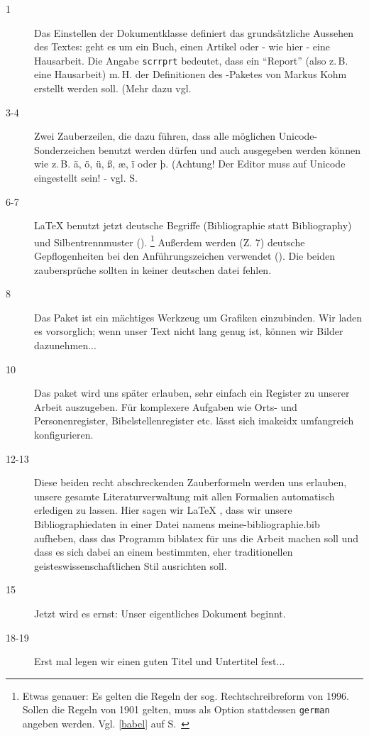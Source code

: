 \begin{description}
 \item[1] Das Einstellen der Dokumentklasse definiert das grundsätzliche Aussehen des 
 Textes: geht es um ein Buch, einen Artikel oder - wie hier - eine Hausarbeit. 
 Die Angabe \lstinline/scrrprt/ bedeutet, dass ein \enquote{Report} (also z.\,B. eine Hausarbeit)
 m.\,H. der Definitionen des \KOMAScript-Paketes von Markus Kohm erstellt werden soll.
 (Mehr dazu vgl. \pageref{komaskript}
 \item[3-4] Zwei Zauberzeilen, die dazu führen, dass alle möglichen Unicode-Sonderzeichen
 benutzt werden dürfen und auch ausgegeben werden können wie z.\,B. ä, ö, ü, ß, æ, ï oder þ.
 (Achtung! Der Editor muss auf Unicode eingestellt sein! - vgl. S.~\pageref{unicode}
 \item[6-7] \LaTeX{} benutzt jetzt deutsche Begriffe (Bibliographie statt Bibliography) und 
 Silbentrennmuster (). 
 \footnote{Etwas genauer: Es gelten die Regeln der sog. Rechtschreibreform von 1996.
 Sollen die Regeln von 1901 gelten, muss als Option stattdessen \lstinline/german/ angeben
 werden. Vgl. \ref{babel} auf S.~\pageref{babel}}
 Außerdem werden (Z. 7) deutsche Gepflogenheiten bei den Anführungszeichen
 verwendet (). 
 Die beiden zaubersprüche sollten in keiner deutschen datei fehlen.
 \item[8] Das Paket  ist ein mächtiges Werkzeug um Grafiken einzubinden.
 Wir laden es vorsorglich; wenn unser Text nicht lang genug ist, können wir Bilder dazunehmen...
 \item[10] Das paket  wird uns später erlauben, sehr einfach ein Register zu unserer
 Arbeit auszugeben.
 Für komplexere Aufgaben wie Orts- und Personenregister, Bibelstellenregister etc. lässt sich
 imakeidx umfangreich konfigurieren.
 \item[12-13] Diese beiden recht abschreckenden Zauberformeln werden uns erlauben, unsere
 gesamte Literaturverwaltung mit allen Formalien automatisch erledigen zu lassen.
 Hier sagen wir \LaTeX{} , dass wir unsere Bibliographiedaten in einer Datei namens 
 meine-bibliographie.bib aufheben, dass das Programm biblatex für uns die Arbeit machen soll
 und dass es sich dabei an einem bestimmten, eher traditionellen geisteswissenschaftlichen
 Stil ausrichten soll.
 \item[15] Jetzt wird es ernst: Unser eigentliches Dokument beginnt.
 \item[18-19] Erst mal legen wir einen guten Titel und Untertitel fest...

\end{description}
